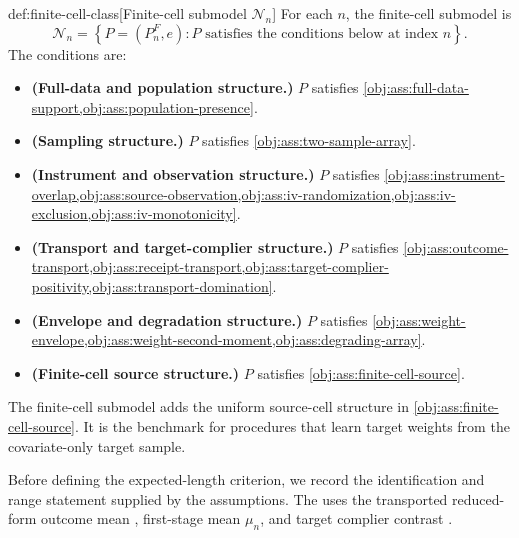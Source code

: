 \documentclass[11pt]{article}
\begin{document}
\begin{definitionv}{def:finite-cell-class}[Finite-cell submodel \(\mathcal N_n\)]
For each \(n\), the finite-cell submodel is
\[
\mathcal N_n
=
\left\{
P=(P_n^F,e):
P \text{ satisfies the conditions below at index } n
\right\}.
\]
The conditions are:
\begin{itemize}
\item \textbf{(Full-data and population structure.)} \(P\) satisfies \cref{obj:ass:full-data-support,obj:ass:population-presence}.
\item \textbf{(Sampling structure.)} \(P\) satisfies \cref{obj:ass:two-sample-array}.
\item \textbf{(Instrument and observation structure.)} \(P\) satisfies \cref{obj:ass:instrument-overlap,obj:ass:source-observation,obj:ass:iv-randomization,obj:ass:iv-exclusion,obj:ass:iv-monotonicity}.
\item \textbf{(Transport and target-complier structure.)} \(P\) satisfies \cref{obj:ass:outcome-transport,obj:ass:receipt-transport,obj:ass:target-complier-positivity,obj:ass:transport-domination}.
\item \textbf{(Envelope and degradation structure.)} \(P\) satisfies \cref{obj:ass:weight-envelope,obj:ass:weight-second-moment,obj:ass:degrading-array}.
\item \textbf{(Finite-cell source structure.)} \(P\) satisfies \cref{obj:ass:finite-cell-source}.
\end{itemize}
\end{definitionv}

The finite-cell submodel  adds the uniform source-cell structure in \cref{obj:ass:finite-cell-source}. It is the benchmark for procedures that learn target weights from the covariate-only target sample.

Before defining the expected-length criterion, we record the identification and range statement supplied by the assumptions. The  uses the transported reduced-form outcome mean , first-stage mean \(\mu_n\), and target complier contrast .
\end{document}
